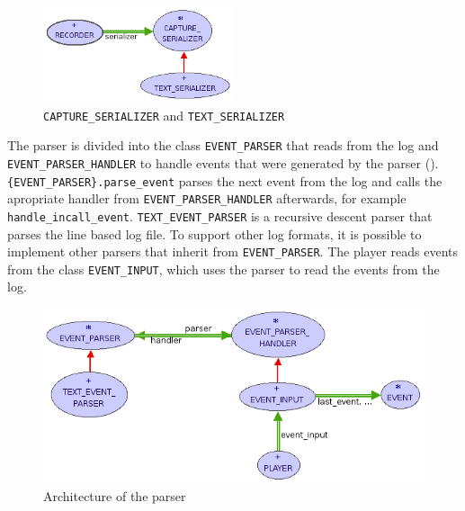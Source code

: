 \begin{figure}[ht]
  \centering
  \includegraphics[width=0.5\textwidth]{illustrations/implementation_serializer.png}
  \caption{\texttt{CAPTURE\_SERIALIZER} and \texttt{TEXT\_SERIALIZER}}
  \label{fig:implementation_serializer}
\end{figure}

The parser is divided into the class \texttt{EVENT\_PARSER} that reads from the log and \texttt{EVENT\_PARSER\_HANDLER} to handle events that were generated by the parser (). \texttt{\{EVENT\_PARSER\}.parse\_event} parses the next event from the log and calls the apropriate handler from \texttt{EVENT\_PARSER\_HANDLER} afterwards, for example \texttt{handle\_incall\_event}.  
\texttt{TEXT\_EVENT\_PARSER} is a recursive descent parser \cite{aho86} that parses the line based log file. To support other log formats, it is possible to implement other parsers that inherit from \texttt{EVENT\_PARSER}.
The player reads events from the class \texttt{EVENT\_INPUT}, which uses the parser to read the events from the log.

\begin{figure}[ht]
  \centering
  \includegraphics[width=1\textwidth]{illustrations/implementation_parser.png}
  \caption{Architecture of the parser}
  \label{fig:implementation_parser}
\end{figure}

